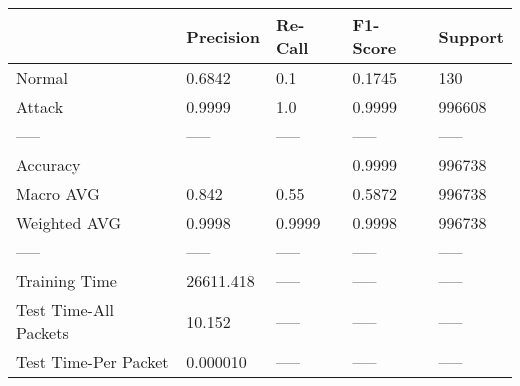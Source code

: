 \begin{tabular}{lllll}
\toprule
{} &  Precision & Re-Call & F1-Score & Support \\
\midrule
Normal                &     0.6842 &     0.1 &   0.1745 &     130 \\
Attack                &     0.9999 &     1.0 &   0.9999 &  996608 \\
-----                 &      ----- &   ----- &    ----- &   ----- \\
Accuracy              &            &         &   0.9999 &  996738 \\
Macro AVG             &      0.842 &    0.55 &   0.5872 &  996738 \\
Weighted AVG          &     0.9998 &  0.9999 &   0.9998 &  996738 \\
-----                 &      ----- &   ----- &    ----- &   ----- \\
Training Time         &  26611.418 &   ----- &    ----- &   ----- \\
Test Time-All Packets &     10.152 &   ----- &    ----- &   ----- \\
Test Time-Per Packet  &   0.000010 &   ----- &    ----- &   ----- \\
\bottomrule
\end{tabular}
